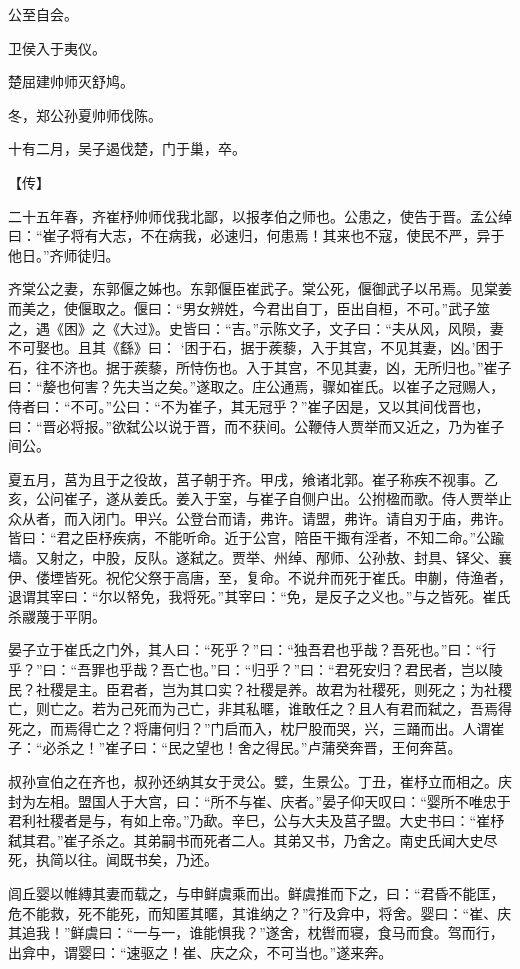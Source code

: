 \documentclass[a4paper,12pt,UTF8,twoside]{ctexbook}
\begin{document}
公至自会。

卫侯入于夷仪。

楚屈建帅师灭舒鸠。

冬，郑公孙夏帅师伐陈。

十有二月，吴子遏伐楚，门于巢，卒。

【传】

二十五年春，齐崔杼帅师伐我北鄙，以报孝伯之师也。公患之，使告于晋。孟公绰曰：“崔子将有大志，不在病我，必速归，何患焉！其来也不寇，使民不严，异于他日。”齐师徒归。

齐棠公之妻，东郭偃之姊也。东郭偃臣崔武子。棠公死，偃御武子以吊焉。见棠姜而美之，使偃取之。偃曰：“男女辨姓，今君出自丁，臣出自桓，不可。”武子筮之，遇《困》之《大过》。史皆曰：“吉。”示陈文子，文子曰：“夫从风，风陨，妻不可娶也。且其《繇》曰： ‘困于石，据于蒺藜，入于其宫，不见其妻，凶。’困于石，往不济也。据于蒺藜，所恃伤也。入于其宫，不见其妻，凶，无所归也。”崔子曰：“嫠也何害？先夫当之矣。”遂取之。庄公通焉，骤如崔氏。以崔子之冠赐人，侍者曰：“不可。”公曰：“不为崔子，其无冠乎？”崔子因是，又以其间伐晋也，曰：“晋必将报。”欲弑公以说于晋，而不获间。公鞭侍人贾举而又近之，乃为崔子间公。

夏五月，莒为且于之役故，莒子朝于齐。甲戌，飨诸北郭。崔子称疾不视事。乙亥，公问崔子，遂从姜氏。姜入于室，与崔子自侧户出。公拊楹而歌。侍人贾举止众从者，而入闭门。甲兴。公登台而请，弗许。请盟，弗许。请自刃于庙，弗许。皆曰：“君之臣杼疾病，不能听命。近于公宫，陪臣干掫有淫者，不知二命。”公踰墙。又射之，中股，反队。遂弑之。贾举、州绰、邴师、公孙敖、封具、铎父、襄伊、偻堙皆死。祝佗父祭于高唐，至，复命。不说弁而死于崔氏。申蒯，侍渔者，退谓其宰曰：“尔以帑免，我将死。”其宰曰：“免，是反子之义也。”与之皆死。崔氏杀鬷蔑于平阴。

晏子立于崔氏之门外，其人曰：“死乎？”曰：“独吾君也乎哉？吾死也。”曰：“行乎？”曰：“吾罪也乎哉？吾亡也。”曰：“归乎？”曰：“君死安归？君民者，岂以陵民？社稷是主。臣君者，岂为其口实？社稷是养。故君为社稷死，则死之；为社稷亡，则亡之。若为己死而为己亡，非其私暱，谁敢任之？且人有君而弑之，吾焉得死之，而焉得亡之？将庸何归？”门启而入，枕尸股而哭，兴，三踊而出。人谓崔子：“必杀之！”崔子曰：“民之望也！舍之得民。”卢蒲癸奔晋，王何奔莒。

叔孙宣伯之在齐也，叔孙还纳其女于灵公。嬖，生景公。丁丑，崔杼立而相之。庆封为左相。盟国人于大宫，曰：“所不与崔、庆者。”晏子仰天叹曰：“婴所不唯忠于君利社稷者是与，有如上帝。”乃歃。辛巳，公与大夫及莒子盟。大史书曰：“崔杼弑其君。”崔子杀之。其弟嗣书而死者二人。其弟又书，乃舍之。南史氏闻大史尽死，执简以往。闻既书矣，乃还。

闾丘婴以帷縳其妻而载之，与申鲜虞乘而出。鲜虞推而下之，曰：“君昏不能匡，危不能救，死不能死，而知匿其暱，其谁纳之？”行及弇中，将舍。婴曰：“崔、庆其追我！”鲜虞曰：“一与一，谁能惧我？”遂舍，枕辔而寝，食马而食。驾而行，出弇中，谓婴曰：“速驱之！崔、庆之众，不可当也。”遂来奔。
\end{document}
